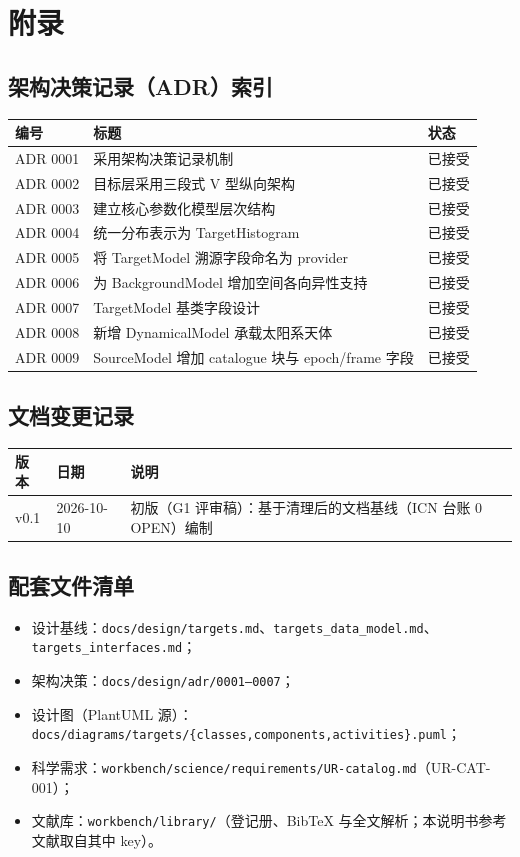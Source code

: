 \section{附录}

\subsection{架构决策记录（ADR）索引}

\begin{center}
\begin{tabular}{lll}
\toprule
编号 & 标题 & 状态 \\
\midrule
ADR 0001 & 采用架构决策记录机制 & 已接受 \\
ADR 0002 & 目标层采用三段式 V 型纵向架构 & 已接受 \\
ADR 0003 & 建立核心参数化模型层次结构 & 已接受 \\
ADR 0004 & 统一分布表示为 TargetHistogram & 已接受 \\
ADR 0005 & 将 TargetModel 溯源字段命名为 provider & 已接受 \\
ADR 0006 & 为 BackgroundModel 增加空间各向异性支持 & 已接受 \\
ADR 0007 & TargetModel 基类字段设计 & 已接受 \\
ADR 0008 & 新增 DynamicalModel 承载太阳系天体 & 已接受 \\
ADR 0009 & SourceModel 增加 catalogue 块与 epoch/frame 字段 & 已接受 \\
\bottomrule
\end{tabular}
\end{center}

\subsection{文档变更记录}

\begin{center}
\begin{tabular}{llp{8.2cm}}
\toprule
版本 & 日期 & 说明 \\
\midrule
v0.1 & 2026-10-10 & 初版（G1 评审稿）：基于清理后的文档基线（ICN 台账 0 OPEN）编制 \\
\bottomrule
\end{tabular}
\end{center}

\subsection{配套文件清单}

\begin{itemize}
  \item 设计基线：\texttt{docs/design/targets.md}、\texttt{targets\_data\_model.md}、\texttt{targets\_interfaces.md}；
  \item 架构决策：\texttt{docs/design/adr/0001--0007}；
  \item 设计图（PlantUML 源）：\texttt{docs/diagrams/targets/\{classes,components,activities\}.puml}；
  \item 科学需求：\texttt{workbench/science/requirements/UR-catalog.md}（UR-CAT-001）；
  \item 文献库：\texttt{workbench/library/}（登记册、BibTeX 与全文解析；本说明书参考文献取自其中 key）。
\end{itemize}
